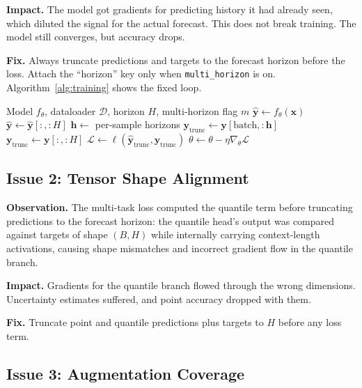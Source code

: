 \documentclass[11pt]{article}
\begin{document}
\textbf{Impact.} The model got gradients for predicting history it had already seen, which diluted the signal for the actual forecast. This does not break training. The model still converges, but accuracy drops.

\textbf{Fix.} Always truncate predictions and targets to the forecast horizon before the loss. Attach the ``horizon'' key only when \texttt{multi\_horizon} is on. Algorithm~\ref{alg:training} shows the fixed loop.

\begin{algorithm}[t]
\caption{Training loop with corrected loss computation.}
\label{alg:training}
\begin{algorithmic}[1]
\Require Model $f_\theta$, dataloader $\mathcal{D}$, horizon $H$, multi-horizon flag $m$
    \State $\hat{\mathbf{y}} \gets f_\theta(\mathbf{x})$
    \State $\hat{\mathbf{y}} \gets \hat{\mathbf{y}}[:, :H]$ 
        \State $\mathbf{h} \gets$ per-sample horizons
        \State $\mathbf{y}_{\text{trunc}} \gets \mathbf{y}[\text{batch}, :\mathbf{h}]$
    \Else
        \State $\mathbf{y}_{\text{trunc}} \gets \mathbf{y}[:, :H]$
    \EndIf
    \State $\mathcal{L} \gets \ell(\hat{\mathbf{y}}_{\text{trunc}}, \mathbf{y}_{\text{trunc}})$
    \State $\theta \gets \theta - \eta \nabla_\theta \mathcal{L}$
\EndFor
\end{algorithmic}
\end{algorithm}

\subsection{Issue 2: Tensor Shape Alignment}
\label{sec:issue2}

\textbf{Observation.} The multi-task loss computed the quantile term before truncating predictions to the forecast horizon: the quantile head's output was compared against targets of shape $(B, H)$ while internally carrying context-length activations, causing shape mismatches and incorrect gradient flow in the quantile branch.

\textbf{Impact.} Gradients for the quantile branch flowed through the wrong dimensions. Uncertainty estimates suffered, and point accuracy dropped with them.

\textbf{Fix.} Truncate point and quantile predictions plus targets to $H$ before any loss term.

\subsection{Issue 3: Augmentation Coverage}
\label{sec:issue3}
\end{document}
